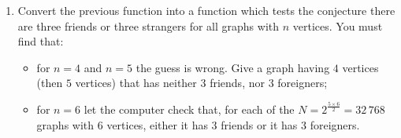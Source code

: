 \documentclass[11pt,class=report,crop=false]{standalone}
\begin{document}
\begin{activite}[Ramsey's theorem for $n=6$]
\begin{enumerate}
  \item Convert the previous function into a function 
which tests the conjecture \og{}there are three friends or three strangers\fg{} for all graphs with $n$ vertices.
You must find that:
\begin{itemize}
\item for $n=4$ and $n=5$ the guess is wrong. Give a graph having $4$ vertices (then $5$ vertices) that has neither $3$ friends, nor $3$ foreigners;
\item for $n=6$ let the computer check that, for each of the $N = 2^{\frac{5 \times 6}{2}} = 32\,768$ graphs with $6$ vertices, either it has $3$ friends or it has $3$ foreigners.
\end{itemize}
\end{enumerate}   
     
\end{activite}
\end{document}

